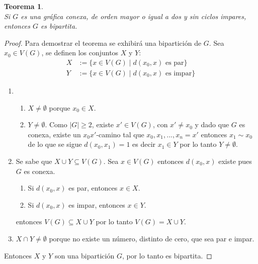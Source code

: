 \documentclass[11pt]{book}
\newtheorem{theorem}{Teorema}
\theoremstyle{definition}
\begin{document}
\begin{theorem}\textbf{}\\
  Si $G$ es una gráfica conexa, de orden mayor o igual a dos y sin ciclos
  impares, entonces $G$ es bipartita.
\end{theorem}

\begin{proof} Para demostrar el teorema se exhibirá una bipartición de $G$. Sea $x_0\in V(G)$, se definen los conjuntos $X$ y $Y$:
\begin{equation*}
  \begin{split}
    X&:=\{ x\in V(G)\mid \text{$d(x_0,x)$ es par}\}\\
    Y&:=\{ x\in V(G)\mid \text{$d(x_0,x)$ es impar}\}
  \end{split}
\end{equation*}

\begin{enumerate}

\item
  \begin{enumerate}
  \item $X\neq \emptyset$ porque $x_0 \in X$.
  \item $Y\neq \emptyset$. Como $|G| \geq 2$, existe $x' \in V(G)$,
    con $x' \neq x_0$ y dado que $G$ es conexa, existe un
    $x_0x'$-camino tal que $x_0, x_1,..., x_n=x'$ entonces $ x_1\sim
    x_0$ de lo que se sigue $d(x_0,x_1)=1$ es decir $x_1 \in Y$ por lo
    tanto $ Y\neq \emptyset$.
  \end{enumerate}
\item Se sabe que $X \cup Y \subseteq V(G)$. Sea $x\in V(G)$ entonces
  $d(x_0,x)$ existe pues $G$ es conexa.

  \begin{enumerate}
  \item Si $d(x_0,x)$ es par, entonces $x\in X$.
  \item Si $d(x_0,x)$ es impar, entonces $x\in Y$.
  \end{enumerate}

  entonces $V(G)\subseteq X\cup Y$ por lo tanto $V(G)= X\cup Y$.

\item $X\cap Y \neq \emptyset$ porque no existe un número, distinto de
  cero, que sea par e impar.
\end{enumerate}

Entonces $X$ y $Y$ son una bipartición $G$, por lo tanto es bipartita.
\end{proof}
\end{document}
